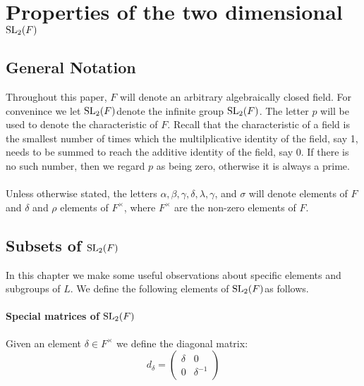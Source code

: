 \chapter{Properties of the two dimensional $\operatorname{SL}_2(F)$}\label{Ch5_PropertiesOfSLOverAlgClosedField}


\section{General Notation}

Throughout this paper, $F$ will denote an arbitrary algebraically closed field. For convenince we let $\operatorname{SL}_2(F)$denote the infinite group $\operatorname{SL}_2(F)$. The letter $p$ will be used to denote the characteristic of $F$. Recall that the characteristic of a field is the smallest number of times which the multilplicative identity of the field, say 1, needs to be summed to reach the additive identity of the field, say 0. If there is no such number, then we regard $p$ as being zero, otherwise it is always a prime. \\
\\
Unless otherwise stated, the letters $\alpha, \beta, \gamma, \delta, \lambda, \gamma$, and $\sigma$ will denote elements of $F$ and $\delta$ and $\rho$ elements of $F^\times$, where $F^\times$  are the non-zero elements of $F$.

\section[Subsets of $L$]{Subsets of $\operatorname{SL}_2(F)$}

In this chapter we make some useful observations about specific elements and subgroups of $L$. We define the following elements of $\operatorname{SL}_2(F)$as follows.

\subsubsection{Special matrices of $\operatorname{SL}_2(F)$}

\begin{definition}
\label{SpecialMatrices.s}
\leanok
    Given an element $\delta \in F^\times$ we define the diagonal matrix:
    \[
    d_\delta = \begin{pmatrix}
        \delta & 0\\
        0 & \delta^{-1}
    \end{pmatrix}
    \]
\end{definition}

